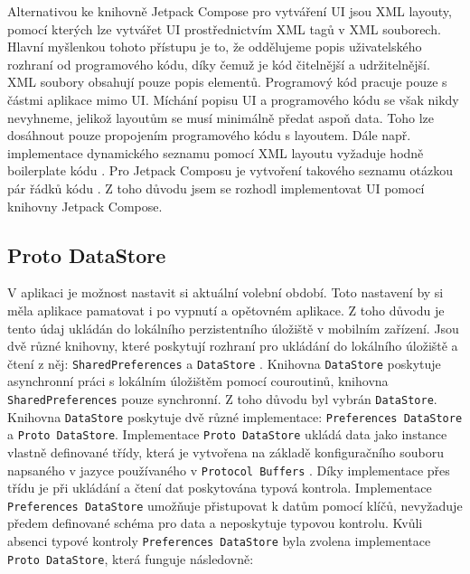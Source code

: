 \noindent Alternativou ke knihovně Jetpack Compose pro vytváření UI jsou XML layouty, pomocí kterých lze vytvářet UI prostřednictvím XML tagů v XML souborech. Hlavní myšlenkou tohoto přístupu je to, že oddělujeme popis uživatelského rozhraní od programového kódu, díky čemuž je kód čitelnější a udržitelnější. XML soubory obsahují pouze popis elementů. Programový kód pracuje pouze s částmi aplikace mimo UI. Míchání popisu UI a programového kódu se však nikdy nevyhneme, jelikož layoutům se musí minimálně předat aspoň data. Toho lze dosáhnout pouze propojením programového kódu s layoutem. Dále např. implementace dynamického seznamu pomocí XML layoutu vyžaduje hodně boilerplate kódu \cite{recycler-view}. Pro Jetpack Composu je vytvoření takového seznamu otázkou pár řádků kódu \cite{lazy-column}. Z toho důvodu jsem se rozhodl implementovat UI pomocí knihovny Jetpack Compose.

\subsection*  {Proto DataStore}
V aplikaci je možnost nastavit si aktuální volební období. Toto nastavení by si měla aplikace pamatovat i po vypnutí a opětovném aplikace. Z toho důvodu je tento údaj ukládán do lokálního perzistentního úložiště v mobilním zařízení. Jsou dvě různé knihovny, které poskytují rozhraní pro ukládání do lokálního úložiště a čtení z něj: \lstinline|SharedPreferences| \cite{shared-preferences} a \lstinline|DataStore| \cite{data-store}. Knihovna \lstinline|DataStore| poskytuje asynchronní práci s lokálním úložištěm pomocí \linebreak couroutinů, knihovna \lstinline|SharedPreferences| pouze synchronní. Z toho důvodu byl vybrán \lstinline|DataStore|. Knihovna \lstinline|DataStore| poskytuje dvě různé implementace: \lstinline|Preferences DataStore| a \lstinline|Proto DataStore|. Implementace \lstinline|Proto DataStore| ukládá data jako instance vlastně definované třídy, která je vytvořena na základě konfiguračního souboru napsaného v jazyce používaného v \lstinline|Protocol Buffers| \cite{protocol-buffers}. Díky implementace přes třídu je při ukládání a čtení dat poskytována typová kontrola. Implementace \lstinline|Preferences DataStore| umožňuje přistupovat k datům pomocí klíčů, nevyžaduje předem definované schéma pro data a neposkytuje typovou kontrolu. Kvůli absenci typové kontroly \lstinline|Preferences DataStore| byla zvolena implementace \lstinline|Proto DataStore|, která funguje následovně:

